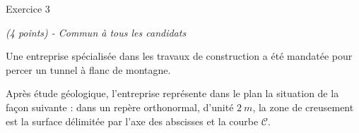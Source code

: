 
%
\begin{h2}Exercice 3\end{h2}
\textit{(4 points) - Commun à tous les candidats}
\par
Une entreprise spécialisée dans les travaux de construction a été mandatée pour percer un tunnel à flanc de montagne.
\par
Après étude géologique, l'entreprise représente dans le plan la situation de la façon suivante : dans un repère orthonormal, d'unité $2~m$, la zone de creusement est la surface délimitée par l'axe des abscisses et la courbe $\mathscr{C}$.

\begin{center}
\end{center}

